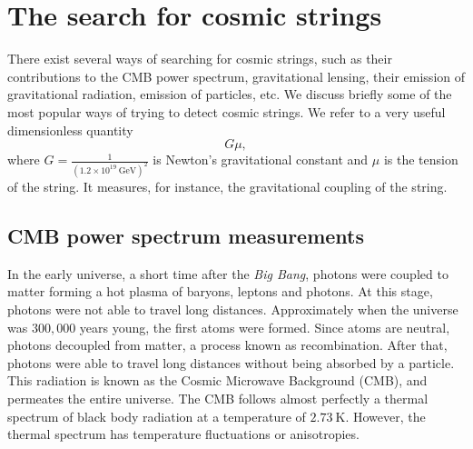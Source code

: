 
\section{The search for cosmic strings}
There exist several ways of searching for cosmic strings, such as their con\-tri\-bu\-tions to the CMB power spectrum, gravitational lensing, their emission of grav\-i\-ta\-tion\-al radiation, emission of particles, etc. We discuss briefly some of the most popular ways of trying to detect cosmic strings. We refer to a very useful dimensionless quantity 
\begin{equation}
	G\mu,
\end{equation} 
where $G = \frac{1}{(1.2\times 10^{19} \ \text{GeV})^2} $ is Newton's gravitational constant and $\mu$ is the tension of the string. It measures, for instance, the gravitational coupling of the string.

\subsection{CMB power spectrum measurements}
In the early universe, a short time after the \textit{Big Bang}, photons were coupled to matter forming a hot plasma of baryons, leptons and photons. At this stage, photons were not able to travel long distances. Approximately when the universe was $300,000$ years young, the first atoms were formed. Since atoms are neutral, photons decoupled from matter, a process known as recombination. After that, photons were able to travel long distances without being absorbed by a particle. This radiation is known as the Cosmic Mi\-cro\-wave Background (CMB), and permeates the entire universe. The CMB follows almost perfectly a thermal spectrum of black body radiation at a temperature of $2.73\ \text{K}$. However, the thermal spectrum has temperature fluctuations or anisotropies.

